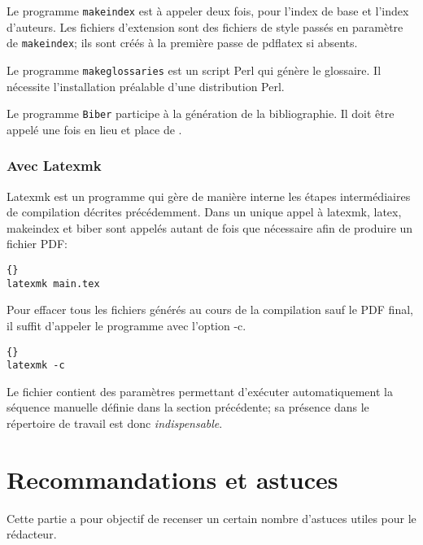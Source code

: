 \documentclass{ltxdockit}
\newcommand*{\biber}{Biber\xspace}
\begin{document}
Le programme \texttt{makeindex} est à appeler deux fois, pour l'index de base et l'index d'auteurs. Les fichiers d'extension  sont des fichiers de style passés en paramètre de \texttt{makeindex}; ils sont créés à la première passe de pdflatex si absents.

Le programme \texttt{makeglossaries} est un script Perl qui génère le glossaire. Il nécessite l'installation préalable d'une distribution Perl.

Le programme \texttt{\biber} participe à la génération de la bibliographie. Il doit être appelé une fois en lieu et place de \bibtex.

\subsubsection{Avec Latexmk}

Latexmk est un programme qui gère de manière interne les étapes intermédiaires de compilation décrites précédemment. Dans un unique appel à latexmk, latex, makeindex et biber sont appelés autant de fois que nécessaire afin de produire un fichier PDF:

\begin{lstlisting}[style=plain]{}
latexmk main.tex
\end{lstlisting}
%

Pour effacer tous les fichiers générés au cours de la compilation sauf le PDF final, il suffit d'appeler le programme avec l'option -c.

\begin{lstlisting}[style=plain]{}
latexmk -c
\end{lstlisting}
%

Le fichier  contient des paramètres permettant d'exécuter automatiquement la séquence manuelle définie dans la section précédente; sa présence dans le répertoire de travail est donc \emph{indispensable}.


\section{Recommandations et astuces}
\label{astuces}

Cette partie a pour objectif de recenser un certain nombre d'astuces utiles pour le rédacteur.
\end{document}
